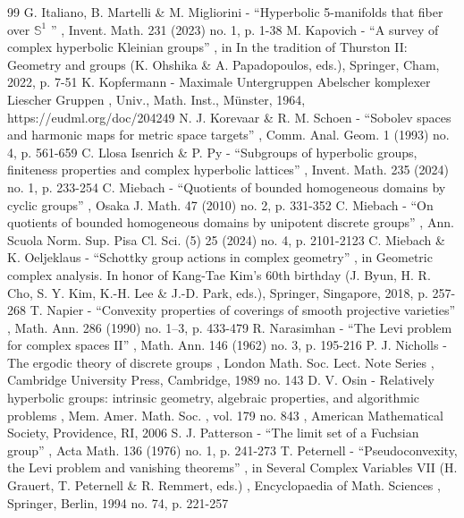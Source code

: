 \documentclass[11pt]{article}
\theoremstyle{definition}
\begin{document}
\begin{thebibliography}{99}
 G. Italiano, B. Martelli \& M. Migliorini - “Hyperbolic 5-manifolds that fiber over $\mathbb{S}^1$ ” , Invent. Math. 231 (2023) no. 1, p. 1-38
 M. Kapovich - “A survey of complex hyperbolic Kleinian groups” , in In the tradition of Thurston II: Geometry and groups (K. Ohshika \& A. Papadopoulos, eds.), Springer, Cham, 2022, p. 7-51
 K. Kopfermann - Maximale Untergruppen Abelscher komplexer Liescher Gruppen , Univ., Math. Inst., Münster, 1964, https://eudml.org/doc/204249
 N. J. Korevaar \& R. M. Schoen - “Sobolev spaces and harmonic maps for metric space targets” , Comm. Anal. Geom. 1 (1993) no. 4, p. 561-659
 C. Llosa Isenrich \& P. Py - “Subgroups of hyperbolic groups, finiteness properties and complex hyperbolic lattices” , Invent. Math. 235 (2024) no. 1, p. 233-254
 C. Miebach - “Quotients of bounded homogeneous domains by cyclic groups” , Osaka J. Math. 47 (2010) no. 2, p. 331-352
 C. Miebach - “On quotients of bounded homogeneous domains by unipotent discrete groups” , Ann. Scuola Norm. Sup. Pisa Cl. Sci. (5) 25 (2024) no. 4, p. 2101-2123
 C. Miebach \& K. Oeljeklaus - “Schottky group actions in complex geometry” , in Geometric complex analysis. In honor of Kang-Tae Kim’s 60th birthday (J. Byun, H. R. Cho, S. Y. Kim, K.-H. Lee \& J.-D. Park, eds.), Springer, Singapore, 2018, p. 257-268
 T. Napier - “Convexity properties of coverings of smooth projective varieties” , Math. Ann. 286 (1990) no. 1–3, p. 433-479
 R. Narasimhan - “The Levi problem for complex spaces II” , Math. Ann. 146 (1962) no. 3, p. 195-216
 P. J. Nicholls - The ergodic theory of discrete groups , London Math. Soc. Lect. Note Series , Cambridge University Press, Cambridge, 1989 no. 143
 D. V. Osin - Relatively hyperbolic groups: intrinsic geometry, algebraic properties, and algorithmic problems , Mem. Amer. Math. Soc. , vol. 179 no. 843 , American Mathematical Society, Providence, RI, 2006
 S. J. Patterson - “The limit set of a Fuchsian group” , Acta Math. 136 (1976) no. 1, p. 241-273
 T. Peternell - “Pseudoconvexity, the Levi problem and vanishing theorems” , in Several Complex Variables VII (H. Grauert, T. Peternell \& R. Remmert, eds.) , Encyclopaedia of Math. Sciences , Springer, Berlin, 1994 no. 74, p. 221-257

\end{thebibliography}
\end{document}
